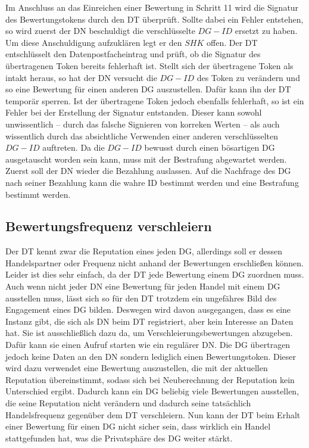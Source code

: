 \documentclass[
	fontsize=11pt,
	headings=small,
	parskip=half,           %
	bibliography=totoc,
	numbers=noenddot,       %
	open=any,               %
]{scrreprt}
\begin{document}
\begin{enumerate}
    Im Anschluss an das Einreichen einer Bewertung in Schritt 11 wird die Signatur des Bewertungstokens durch den DT überprüft. Sollte dabei ein Fehler entstehen, so wird zuerst der DN beschuldigt die verschlüsselte $DG-ID$ ersetzt zu haben. Um diese Anschuldigung aufzuklären legt er den $SHK$ offen. Der DT entschlüsselt den Datenpostfacheintrag und prüft, ob die Signatur des übertragenen Token bereits fehlerhaft ist. Stellt sich der übertragene Token als intakt heraus, so hat der DN versucht die $DG-ID$ des Token zu verändern und so eine Bewertung für einen anderen DG auszustellen. Dafür kann ihn der DT temporär sperren. Ist der übertragene Token jedoch ebenfalls fehlerhaft, so ist ein Fehler bei der Erstellung der Signatur entstanden. Dieser kann sowohl unwissentlich -- durch das falsche Signieren von korreken Werten -- als auch wissentlich durch das absichtliche Verwenden einer anderen verschlüsselten $DG-ID$ auftreten. Da die $DG-ID$ bewusst durch einen bösartigen DG ausgetauscht worden sein kann, muss mit der Bestrafung abgewartet werden. Zuerst soll der DN wieder die Bezahlung auslassen. Auf die Nachfrage des DG nach seiner Bezahlung kann die wahre ID bestimmt werden und eine Bestrafung bestimmt werden.
\end{enumerate}

\subsection{Bewertungsfrequenz verschleiern}
\label{sec:ratingObfuscation}
Der DT kennt zwar die Reputation eines jeden DG, allerdings soll er dessen Handelspartner oder Frequenz nicht anhand der Bewertungen erschließen können. Leider ist dies sehr einfach, da der DT jede Bewertung einem DG zuordnen muss. Auch wenn nicht jeder DN eine Bewertung für jeden Handel mit einem DG ausstellen muss, lässt sich so für den DT trotzdem ein ungefähres Bild des Engagement eines DG bilden. Deswegen wird davon ausgegangen, dass es eine Instanz gibt, die sich als DN beim DT registriert, aber kein Interesse an Daten hat. Sie ist ausschließlich dazu da, um Verschleierungsbewertungen abzugeben. Dafür kann sie einen Aufruf starten wie ein regulärer DN. Die DG übertragen jedoch keine Daten an den DN sondern lediglich einen Bewertungstoken. Dieser wird dazu verwendet eine Bewertung auszustellen, die mit der aktuellen Reputation übereinstimmt, sodass sich bei Neuberechnung der Reputation kein Unterschied ergibt. Dadurch kann ein DG beliebig viele Bewertungen ausstellen, die seine Reputation nicht verändern und dadurch seine tatsächlich Handelsfrequenz gegenüber dem DT verschleiern. Nun kann der DT beim Erhalt einer Bewertung für einen DG nicht sicher sein, dass wirklich ein Handel stattgefunden hat, was die Privatsphäre des DG weiter stärkt.\\
\end{document}
